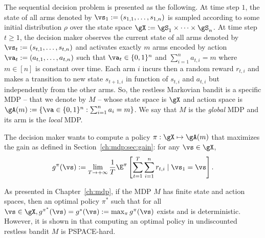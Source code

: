 The sequential decision problem is presented as the following.
At time step $1$, the state of all arms denoted by $\vs_1:=(s_{1,1},\dots,s_{1,n})$ is sampled according to some initial distribution $\rho$ over the state space $\gX:=\gS_1\times\dots\times\gS_n$.
At time step $t\ge1$, the decision maker observes the current state of all arms denoted by $\vs_t:=(s_{t,1},\dots,s_{t,n})$ and activates exactly $m$ arms encoded by action $\va_t:=(a_{t,1},\dots,a_{t,n})$ such that $\va_t\in\{0,1\}^n$ and $\sum_{i=1}^{n} a_{t,i}=m$ where $m\in[n]$ is constant over time.
Each arm $i$ incurs then a random reward $r_{t,i}$ and makes
a transition to new state $s_{t+1,i}$ in function of $s_{t,i}$ and $a_{t,i}$ but independently from the other arms.
So, the restless Markovian bandit is a specific MDP -- that we denote by $M$ -- whose state space is $\gX$ and action space is $\gA(m):=\{\va\in\{0,1\}^n : \sum_{i=1}^{n}a_i =m\}$.
We say that $M$ is the \emph{global} MDP and its arm is the \emph{local} MDP.

The decision maker wants to compute a policy $\pi:\gX\mapsto\gA(m)$ that maximizes the gain as defined in Section~\ref{ch:mdp:sec:gain}: for any $\vs\in\gX$,
\begin{equation}
    \label{ch:restless:eq:obj}
    g^\pi(\vs):=\lim_{T\to+\infty}\frac1T \E^\pi\left[ \sum_{t=1}^{T} \sum_{i=1}^nr_{t,i} \mid \vs_1=\vs\right].
\end{equation}

As presented in Chapter~\ref{ch:mdp}, if the MDP $M$ has finite state and action spaces, then an optimal policy $\pi^*$ such that for all $\vs\in\gX, g^{\pi^*}(\vs)=g^*(\vs):=\max_{\pi}g^{\pi}(\vs)$ exists and is deterministic.
However, it is shown in \cite[Theorem~4]{papadimitriou1994complexity} that computing an optimal policy in undiscounted restless bandit $M$ is PSPACE-hard.


